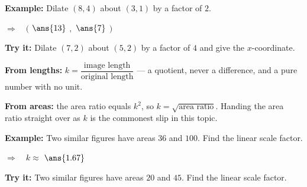 \documentclass[12pt]{article}
\begin{document}
\begin{examplebox}
\textbf{Example:} \quad Dilate $(8, 4)$ about $(3, 1)$ by a factor of $2$.

$\Rightarrow\quad ($ $\ans{13}$ $,$ $\ans{7}$ $)$
\end{examplebox}

\begin{tryitbox}
\textbf{Try it:} \quad Dilate $(7, 2)$ about $(5, 2)$ by a factor of $4$ and give the $x$-coordinate.\\[2pt]
\end{tryitbox}


\begin{formulabox}
\textbf{From lengths:} $k = \dfrac{\text{image length}}{\text{original length}}$ --- a quotient, never a difference, and a pure number with no unit.\par
\textbf{From areas:} the area ratio equals $k^2$, so $k = \sqrt{\text{area ratio}}$. Handing the area ratio straight over as $k$ is the commonest slip in this topic.
\end{formulabox}

\begin{examplebox}
\textbf{Example:} \quad Two similar figures have areas $36$ and $100$. Find the linear scale factor.

$\Rightarrow\quad k \approx$ $\ans{1.67}$
\end{examplebox}

\begin{tryitbox}
\textbf{Try it:} \quad Two similar figures have areas $20$ and $45$. Find the linear scale factor.\\[2pt]
\end{tryitbox}
\end{document}
